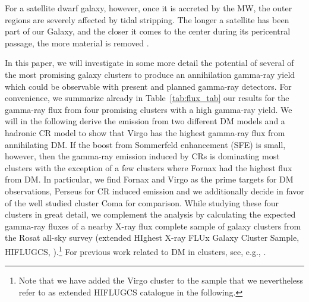 \documentclass[10pt,aps,pra,reprint,amsmath,amsfonts,amssymb,showpacs,nofootinbib,floatfix]{revtex4-1}
\begin{document}
For a satellite dwarf galaxy, however, once it is accreted by the MW,
the outer regions are severely affected by tidal stripping. The longer
a satellite has been part of our Galaxy, and the closer it comes to
the center during its pericentral passage, the more material is
removed \cite{2004MNRAS.355..819G}.

In this paper, we will investigate in some more detail the potential
of several of the most promising galaxy clusters to produce an
annihilation gamma-ray yield which could be observable with present
and planned gamma-ray detectors. For convenience, we summarize already
in Table~\ref{tab:flux_tab} our results for the gamma-ray flux from
four promising clusters with a high gamma-ray yield. We will in the
following derive the emission from two different DM models and a
hadronic CR model to show that Virgo has the highest gamma-ray flux
from annihilating DM. If the boost from Sommerfeld enhancement (SFE)
is small, however, then the gamma-ray emission induced by CRs is
dominating most clusters with the exception of a few clusters where
Fornax had the highest flux from DM. In particular, we find Fornax and
Virgo as the prime targets for DM observations, Perseus for CR induced
emission and we additionally decide in favor of the well studied
cluster Coma for comparison. While studying these four clusters in
great detail, we complement the analysis by calculating the expected
gamma-ray fluxes of a nearby X-ray flux complete sample of galaxy
clusters from the Rosat all-sky survey (extended HIghest X-ray FLUx
Galaxy Cluster Sample, HIFLUGCS,
\citealt{2002ApJ...567..716R}).\footnote{Note that we have added the
  Virgo cluster to the sample that we nevertheless refer to as
  extended HIFLUGCS catalogue in the following.}  For previous work
related to DM in clusters, see, e.g.,
\cite{2006A&A...455...21C,2009PhRvD..80b3005J,2011arXiv1104.3530S,2011ApJ...726L...6C,2010JCAP...05..025A}.
\end{document}

